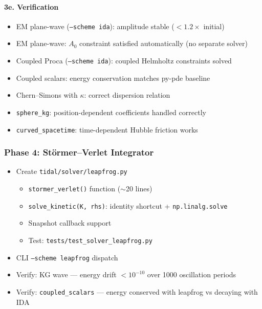 \paragraph{3e. Verification}
\label{par:phase3-verify}

\begin{itemize}
  \item[$\square$] EM plane-wave (\texttt{--scheme ida}): amplitude stable ($< 1.2\times$ initial)
  \item[$\square$] EM plane-wave: $A_0$ constraint satisfied automatically (no separate solver)
  \item[$\square$] Coupled Proca (\texttt{--scheme ida}): coupled Helmholtz constraints solved
  \item[$\square$] Coupled scalars: energy conservation matches py-pde baseline
  \item[$\square$] Chern--Simons with $\kappa$: correct dispersion relation
  \item[$\square$] \texttt{sphere\_kg}: position-dependent coefficients handled correctly
  \item[$\square$] \texttt{curved\_spacetime}: time-dependent Hubble friction works
\end{itemize}

\subsubsection{Phase 4: St\"ormer--Verlet Integrator}
\label{sec:phase4}

\begin{itemize}
  \item[$\square$] Create \texttt{tidal/solver/leapfrog.py}
  \begin{itemize}
    \item \texttt{stormer\_verlet()} function ($\sim$20 lines)
    \item \texttt{solve\_kinetic(K, rhs)}: identity shortcut + \texttt{np.linalg.solve}
    \item Snapshot callback support
    \item Test: \texttt{tests/test\_solver\_leapfrog.py}
  \end{itemize}
  \item[$\square$] CLI \texttt{--scheme leapfrog} dispatch
  \item[$\square$] Verify: KG wave --- energy drift $< 10^{-10}$ over 1000 oscillation periods
  \item[$\square$] Verify: \texttt{coupled\_scalars} --- energy conserved with leapfrog vs decaying with IDA
\end{itemize}

